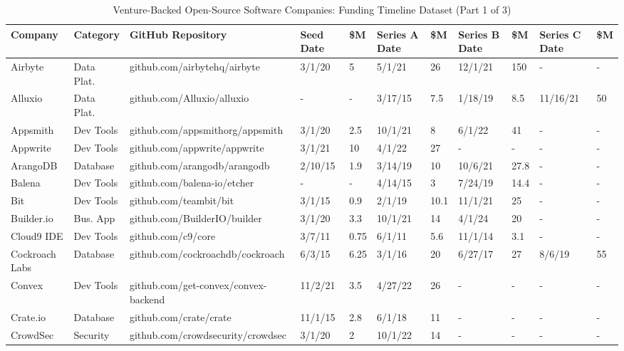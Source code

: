\clearpage
\begin{landscape}

\renewcommand{\arraystretch}{1.3}

\begin{table}[htbp]
\centering
\scriptsize
\caption{Venture-Backed Open-Source Software Companies: Funding Timeline Dataset (Part 1 of 3)}
\label{tab:seed_data_1}
\begin{tabular}{|p{2.2cm}|p{1.6cm}|p{4cm}|p{1.1cm}|p{0.9cm}|p{1.1cm}|p{0.9cm}|p{1.1cm}|p{0.9cm}|p{1.1cm}|p{0.9cm}|}
\hline
\textbf{Company} & \textbf{Category} & \textbf{GitHub Repository} & \textbf{Seed Date} & \textbf{\$M} & \textbf{Series A Date} & \textbf{\$M} & \textbf{Series B Date} & \textbf{\$M} & \textbf{Series C Date} & \textbf{\$M} \\
\hline
Airbyte & Data Plat. & github.com/airbytehq/airbyte & 3/1/20 & 5 & 5/1/21 & 26 & 12/1/21 & 150 & - & - \\
Alluxio & Data Plat. & github.com/Alluxio/alluxio & - & - & 3/17/15 & 7.5 & 1/18/19 & 8.5 & 11/16/21 & 50 \\
Appsmith & Dev Tools & github.com/appsmithorg/appsmith & 3/1/20 & 2.5 & 10/1/21 & 8 & 6/1/22 & 41 & - & - \\
Appwrite & Dev Tools & github.com/appwrite/appwrite & 3/1/21 & 10 & 4/1/22 & 27 & - & - & - & - \\
ArangoDB & Database & github.com/arangodb/arangodb & 2/10/15 & 1.9 & 3/14/19 & 10 & 10/6/21 & 27.8 & - & - \\
Balena & Dev Tools & github.com/balena-io/etcher & - & - & 4/14/15 & 3 & 7/24/19 & 14.4 & - & - \\
Bit & Dev Tools & github.com/teambit/bit & 3/1/15 & 0.9 & 2/1/19 & 10.1 & 11/1/21 & 25 & - & - \\
Builder.io & Bus. App & github.com/BuilderIO/builder & 3/1/20 & 3.3 & 10/1/21 & 14 & 4/1/24 & 20 & - & - \\
Cloud9 IDE & Dev Tools & github.com/c9/core & 3/7/11 & 0.75 & 6/1/11 & 5.6 & 11/1/14 & 3.1 & - & - \\
Cockroach Labs & Database & github.com/cockroachdb/cockroach & 6/3/15 & 6.25 & 3/1/16 & 20 & 6/27/17 & 27 & 8/6/19 & 55 \\
Convex & Dev Tools & github.com/get-convex/convex-backend & 11/2/21 & 3.5 & 4/27/22 & 26 & - & - & - & - \\
Crate.io & Database & github.com/crate/crate & 11/1/15 & 2.8 & 6/1/18 & 11 & - & - & - & - \\
CrowdSec & Security & github.com/crowdsecurity/crowdsec & 3/1/20 & 2 & 10/1/22 & 14 & - & - & - & - \\

\end{tabular}
\end{table}
\end{landscape}
